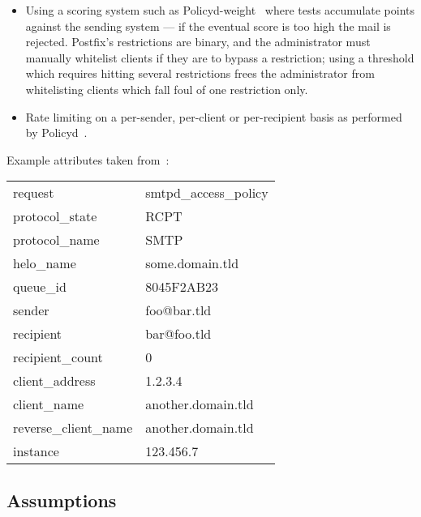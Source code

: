 \begin{itemize}
    \item Using a scoring system such as
        Policyd-weight~\cite{policyd-weight} where tests accumulate points
        against the sending system --- if the eventual score is too high
        the mail is rejected.  Postfix's restrictions are binary, and the
        administrator must manually whitelist clients if they are to bypass
        a restriction; using a threshold which requires hitting several
        restrictions frees the administrator from whitelisting clients
        which fall foul of one restriction only.

    \item Rate limiting on a per-sender, per-client or per-recipient basis
        as performed by Policyd~\cite{policyd}.

\end{itemize}

Example attributes taken from~\cite{policy-servers}:

\begin{tabular}[]{ll}

    request                 & smtpd\_access\_policy     \\
    protocol\_state         & RCPT                      \\
    protocol\_name          & SMTP                      \\
    helo\_name              & some.domain.tld           \\
    queue\_id               & 8045F2AB23                \\
    sender                  & foo@bar.tld               \\
    recipient               & bar@foo.tld               \\
    recipient\_count        & 0                         \\
    client\_address         & 1.2.3.4                   \\
    client\_name            & another.domain.tld        \\
    reverse\_client\_name   & another.domain.tld        \\
    instance                & 123.456.7                 \\

\end{tabular}



\subsection{Assumptions}

